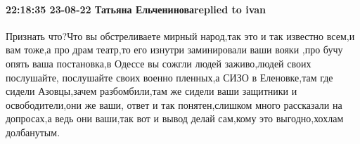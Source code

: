  
 
 
 
 

\paragraph{22:18:35 23-08-22 Татьяна Ельчениноваreplied to ivan}

Признать что?Что вы обстреливаете мирный народ,так это и так известно всем,и
вам тоже,а про драм театр,то его изнутри заминировали ваши вояки ,про бучу
опять ваша постановка,в Одессе вы сожгли людей заживо,людей своих послушайте,
послушайте своих военно пленных,а СИЗО в Еленовке,там где сидели Азовцы,зачем
разбомбили,там же сидели ваши защитники и освободители,они же ваши, ответ и так
понятен,слишком много рассказали на допросах,а ведь они ваши,так вот и вывод
делай сам,кому это выгодно,хохлам долбанутым.
